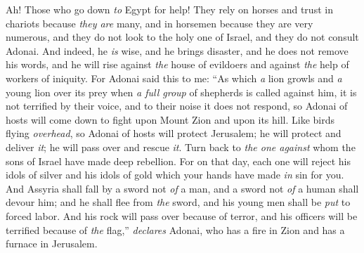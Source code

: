 \begin{biblechapter} %
 Ah! Those who go down \textit{to} Egypt for help! They rely on horses
\verse and trust in chariots because \textit{they are} many, 
and in horsemen because they are very numerous, 
and they do not look to the holy one of Israel, 
and they do not consult Adonai.
\verse And indeed, he \textit{is} wise, and he brings disaster, 
and he does not remove his words, 
and he will rise against \textit{the} house of evildoers 
and against \textit{the} help of workers of iniquity.
\verse For Adonai said this to me: “As which \textit{a} lion growls 
and \textit{a} young lion over its prey when \textit{a full group} of shepherds is called against him, it is not terrified by their voice, 
and to their noise it does not respond, 
so Adonai of hosts will come down to fight upon Mount Zion 
and upon its hill.
\verse Like birds flying \textit{overhead}, so Adonai of hosts will protect Jerusalem; he will protect and deliver \textit{it}; 
he will pass over and rescue \textit{it}.
\verse Turn back to \textit{the one against} whom the sons of Israel have made deep rebellion.
\verse For on that day, each one will reject his idols of silver 
and his idols of gold which your hands have made \textit{in} sin for you.
\verse And Assyria shall fall by a sword not \textit{of} a man, 
and a sword not \textit{of} a human shall devour him; 
and he shall flee from \textit{the} sword, 
and his young men shall be \textit{put} to forced labor.
\verse And his rock will pass over because of terror, 
and his officers will be terrified because of \textit{the} flag,” 
\textit{declares} Adonai, 
who has a fire in Zion 
and has a furnace in Jerusalem.
\end{biblechapter}

